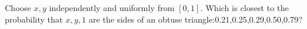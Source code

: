 Choose $x,y$ independently and uniformly from $[0,1]$. Which is closest to the probability that $x,y,1$ are the sides of an obtuse triangle:0.21,0.25,0.29,0.50,0.79?
